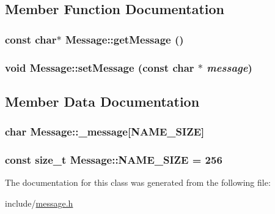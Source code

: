 \subsection{Member Function Documentation}
\hypertarget{classMessage_6a450a5485d42c4df9e613c113984a47}{
\subsubsection[{getMessage}]{\setlength{\rightskip}{0pt plus 5cm}const char$\ast$ Message::getMessage ()}}
\label{classMessage_6a450a5485d42c4df9e613c113984a47}


\hypertarget{classMessage_d314fcba26617f865d67453eab4337c2}{
\subsubsection[{setMessage}]{\setlength{\rightskip}{0pt plus 5cm}void Message::setMessage (const char $\ast$ {\em message})}}
\label{classMessage_d314fcba26617f865d67453eab4337c2}




\subsection{Member Data Documentation}
\hypertarget{classMessage_249a964d400dbbac3e1e2ff3f57b4f9a}{
\subsubsection[{\_\-message}]{\setlength{\rightskip}{0pt plus 5cm}char {\bf Message::\_\-message}\mbox{[}{\bf NAME\_\-SIZE}\mbox{]}}}
\label{classMessage_249a964d400dbbac3e1e2ff3f57b4f9a}


\hypertarget{classMessage_47c25dd0a21ab2c3b1bd8703d5f2abd9}{
\subsubsection[{NAME\_\-SIZE}]{\setlength{\rightskip}{0pt plus 5cm}const size\_\-t {\bf Message::NAME\_\-SIZE} = 256}}
\label{classMessage_47c25dd0a21ab2c3b1bd8703d5f2abd9}




The documentation for this class was generated from the following file:\begin{CompactItemize}
\item 
include/\hyperlink{message_8h}{message.h}\end{CompactItemize}
